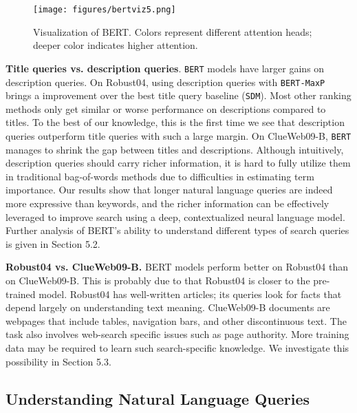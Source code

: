 \documentclass[sigconf]{acmart}
\begin{document}
\begin{figure}[tb]
     \centering
     
     \texttt{[image: figures/bertviz5.png]}
     \caption{Visualization of BERT. Colors represent different attention heads; deeper color indicates higher attention. } \label{fig:bertviz}
 \end{figure}
 
 

\textbf{Title queries vs. description queries}. \texttt{BERT} models have larger gains on description queries. On Robust04, using description queries with \texttt{BERT-MaxP} brings a  improvement over the best title query baseline (\texttt{SDM}). Most other ranking methods only get similar or worse performance on descriptions compared to titles. To the best of our knowledge, this is the first time we see that description queries outperform title queries with such a large margin. On ClueWeb09-B,  \texttt{BERT} manages to shrink the gap between titles and descriptions. Although intuitively, description queries should carry richer information, it is hard to fully utilize them in traditional bag-of-words methods due to difficulties in estimating term importance. Our results show that longer natural language queries are indeed more expressive than keywords, and the richer information can be effectively leveraged to improve search using a deep, contextualized neural language model. Further analysis of BERT's ability to understand different types of search queries is given in Section 5.2.

\textbf{Robust04 vs. ClueWeb09-B.} BERT models perform better on Robust04 than on ClueWeb09-B. This is probably due to that Robust04 is closer to the pre-trained model. Robust04 has well-written articles; its queries look for facts that depend largely on understanding text meaning. ClueWeb09-B documents are webpages that include tables, navigation bars, and other discontinuous text. The task also involves web-search specific issues such as page authority. More training data may be required to learn such search-specific knowledge. We investigate this possibility in Section 5.3.




 

\subsection{Understanding Natural Language Queries}
\end{document}

